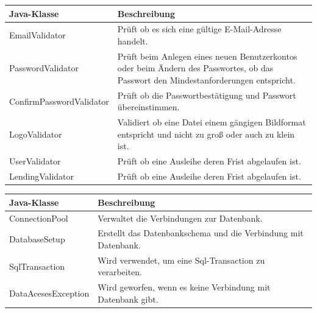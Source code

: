 \documentclass{article}
\begin{document}
        
  \begin{center}
    \begin{table}
        \begin{tabular} { |p{}|p{}| }
             \hline
            Java-Klasse & Beschreibung  \\
           \hline\hline
            EmailValidator & Prüft ob es sich eine gültige E-Mail-Adresse handelt. \\
            \hline
            PasswordValidator & Prüft beim Anlegen eines neuen Benutzerkontos oder beim Ändern des Passwortes, ob das Passwort den Mindestanforderungen entspricht. \\
             \hline
            ConfirmPasswordValidator & Prüft ob die Passwortbestätigung und Passwort
           übereinstimmen. \\
            \hline
           LogoValidator & Validiert ob eine Datei einem gängigen Bildformat entspricht und nicht zu groß oder auch zu klein ist. \\
             \hline
            UserValidator & Prüft ob eine Ausleihe deren Frist abgelaufen ist. \\
            \hline
            LendingValidator & Prüft ob eine Ausleihe deren Frist abgelaufen ist. \\
            \hline
        \end{tabular}
        \end{table}
        \end{center}
      
        
  \begin{center}
    \begin{table}
        \begin{tabular} { |p{}|p{}| }
              \hline
            Java-Klasse & Beschreibung  \\
           \hline\hline
            ConnectionPool & Verwaltet die Verbindungen zur Datenbank. \\
            \hline
            DatabaseSetup& Erstellt das Datenbankschema und die Verbindung mit Datenbank. \\
             \hline
            SqlTransaction& Wird verwendet, um eine Sql-Transaction zu verarbeiten. \\
             \hline
            DataAcesesException& Wird geworfen,  wenn es keine Verbindung mit Datenbank gibt. \\
           \hline
        \end{tabular}
        \end{table}
        \end{center}
       
\end{document}
